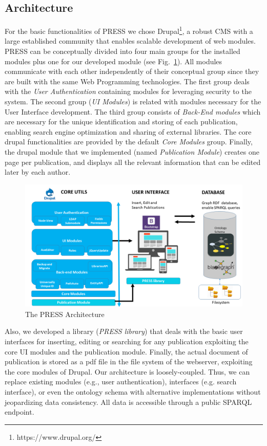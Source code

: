 \documentclass[runningheads,a4paper]{llncs}
\makeatletter
\def\maxwidth#1{\ifdim\Gin@nat@width>#1 #1\else\Gin@nat@width\fi}
\makeatother
\begin{document}
\subsection{Architecture}

For the basic functionalities of PRESS we chose Drupal\footnote{ https://www.drupal.org/}, a robust CMS with a large established community that enables scalable development of web modules. PRESS can be conceptually divided into four main groups for the installed modules plus one for our developed module (see Fig.~\ref{_Ref490664034}). All modules communicate with each other independently of their conceptual group since they are built with the same Web Programming technologies. The first group deals with the {\em User Authentication }containing modules for leveraging security to the system. The second group ({\em UI Modules}) is related with modules necessary for the User Interface development. The third group consists of {\em Back-End modules} which are necessary for the unique identification and storing of each publication, enabling search engine optimization and sharing of external libraries. The core drupal functionalities are provided by the default {\em Core Modules }group.  Finally, the drupal module that we implemented (named {\em Publication Module}) creates one page per publication, and displays all the relevant information that can be edited later by each author.
\begin{figure}[h!]
\centering
\includegraphics[width=\maxwidth{\textwidth}]{./img/image2.png}
\cprotect\caption{The PRESS Architecture}
\label{_Ref490664034}
\end{figure}


Also, we developed a library ({\em PRESS library}) that deals with the basic user interfaces for inserting, editing or searching for any publication exploiting the core UI modules and the publication module. Finally, the actual document of publication is stored as a pdf file in the file system of the webserver, exploiting the core modules of Drupal. Our architecture is loosely-coupled. Thus, we can replace existing modules (e.g., user authentication), interfaces (e.g. search interface), or even the ontology schema with alternative implementations without jeopardizing data consistency. All data is accessible through a public SPARQL endpoint. 
\end{document}
